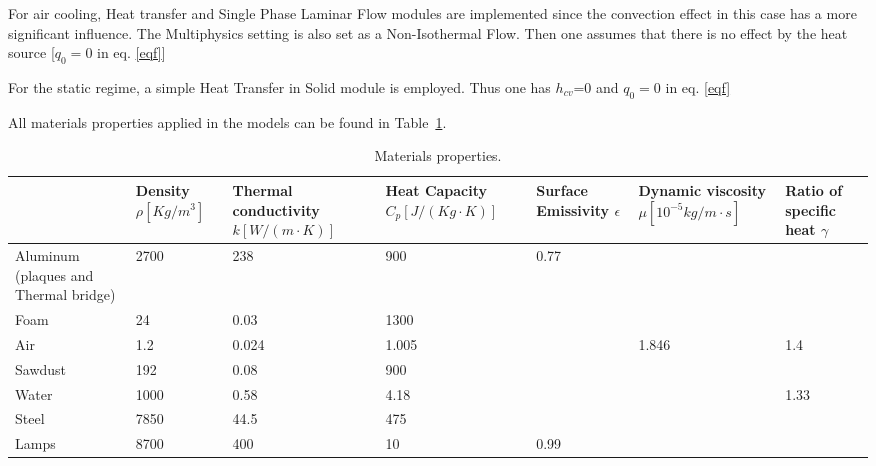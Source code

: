 \documentclass{tQRT2e}
\begin{document}
For air cooling, Heat transfer and Single Phase Laminar Flow modules are implemented since the convection effect in this case has a more significant influence. The Multiphysics setting is also set as a Non-Isothermal Flow. Then one assumes that there is no effect by the heat source [$ q_0=0 $ in eq. \ref{eqf}]

For the static regime, a simple Heat Transfer in Solid module is employed. Thus one has $ h_{cv} $=0 and $ q_0=0 $ in eq. \ref{eqf}

All materials properties applied in the models can be found in Table~\ref{mat_pro}. 
 \begin{table}[ht]
  	\centering
  	\scriptsize
 	\caption{Materials properties.}
 {\begin{tabular}{p{1.5cm}|p{1.5cm}p{1.5cm}p{1.5cm}p{1.5cm}p{1.5cm}p{1.5cm}}
 	\hline
	      & Density $\rho [Kg/m^3] $
	      & Thermal conductivity  $k [W/(m\cdot K)] $
          & Heat Capacity $C_p [J/(Kg\cdot K)]$
          & Surface Emissivity $\epsilon$
          & Dynamic viscosity $\mu [10^{-5}kg/m\cdot s]$ 
          & Ratio of specific heat $\gamma$   \\
	 \hline
   Aluminum (plaques and Thermal bridge)	&2700	&238	&900 &0.77 & & \\
   Foam	&24	&0.03	&1300 & & & \\
   Air	&1.2 &0.024	&1.005 & &1.846 &1.4 \\
   Sawdust	&192	&0.08	&900 & & & \\
   Water &1000	&0.58	&4.18 & & &1.33 \\
   Steel &7850	&44.5	&475 & & & \\
   Lamps &8700	&400	&10 &0.99 & & \\
	 \hline
 \end{tabular}}
 \label{mat_pro}
 \end{table}
\end{document}

